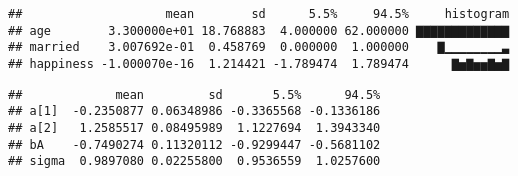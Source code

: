 \documentclass[
]{article}
\newenvironment{Shaded}{\begin{snugshade}}{\end{snugshade}}
\newcommand{\CommentTok}[1]{\textcolor[rgb]{0.56,0.35,0.01}{\textit{#1}}}
\newcommand{\DataTypeTok}[1]{\textcolor[rgb]{0.13,0.29,0.53}{#1}}
\newcommand{\DecValTok}[1]{\textcolor[rgb]{0.00,0.00,0.81}{#1}}
\newcommand{\FloatTok}[1]{\textcolor[rgb]{0.00,0.00,0.81}{#1}}
\newcommand{\KeywordTok}[1]{\textcolor[rgb]{0.13,0.29,0.53}{\textbf{#1}}}
\newcommand{\NormalTok}[1]{#1}
\newcommand{\OperatorTok}[1]{\textcolor[rgb]{0.81,0.36,0.00}{\textbf{#1}}}
\newcommand{\StringTok}[1]{\textcolor[rgb]{0.31,0.60,0.02}{#1}}
\begin{document}
\begin{verbatim}
##                    mean        sd      5.5%     94.5%     histogram
## age        3.300000e+01 18.768883  4.000000 62.000000 ▇▇▇▇▇▇▇▇▇▇▇▇▇
## married    3.007692e-01  0.458769  0.000000  1.000000    ▇▁▁▁▁▁▁▁▁▃
## happiness -1.000070e-16  1.214421 -1.789474  1.789474      ▇▅▇▅▅▇▅▇
\end{verbatim}

\begin{Shaded}
\end{Shaded}

\begin{verbatim}
##             mean         sd       5.5%      94.5%
## a[1]  -0.2350877 0.06348986 -0.3365568 -0.1336186
## a[2]   1.2585517 0.08495989  1.1227694  1.3943340
## bA    -0.7490274 0.11320112 -0.9299447 -0.5681102
## sigma  0.9897080 0.02255800  0.9536559  1.0257600
\end{verbatim}
\end{document}
